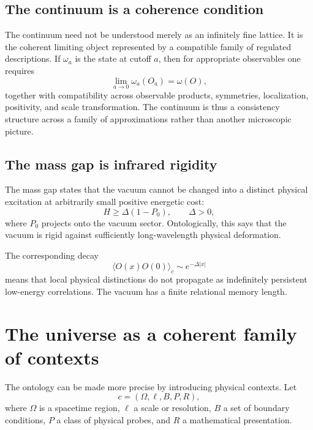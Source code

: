 \documentclass[11pt]{article}
\begin{document}
\subsection{The continuum is a coherence condition}

The continuum need not be understood merely as an infinitely fine lattice.  It
is the coherent limiting object represented by a compatible family of
regulated descriptions.  If $\omega_a$ is the state at cutoff $a$, then for
appropriate observables one requires
\begin{equation}
  \lim_{a\to0}\omega_a(O_a)=\omega(O),
  \label{eq:continuum-coherence}
\end{equation}
together with compatibility across observable products, symmetries,
localization, positivity, and scale transformation.  The continuum is thus a
consistency structure across a family of approximations rather than another
microscopic picture.

\subsection{The mass gap is infrared rigidity}

The mass gap states that the vacuum cannot be changed into a distinct physical
excitation at arbitrarily small positive energetic cost:
\begin{equation}
  H\geq\Delta(1-P_0),
  \qquad \Delta>0,
  \label{eq:mass-gap}
\end{equation}
where $P_0$ projects onto the vacuum sector.  Ontologically, this says that the
vacuum is rigid against sufficiently long-wavelength physical deformation.

The corresponding decay
\begin{equation}
  \langle O(x)O(0)\rangle_c
  \sim e^{-\Delta|x|}
  \label{eq:clustering}
\end{equation}
means that local physical distinctions do not propagate as indefinitely
persistent low-energy correlations.  The vacuum has a finite relational memory
length.

\section{The universe as a coherent family of contexts}

The ontology can be made more precise by introducing physical contexts.  Let
\begin{equation}
  c=(\Omega,\ell,B,P,R),
  \label{eq:context}
\end{equation}
where $\Omega$ is a spacetime region, $\ell$ a scale or resolution, $B$ a set of
boundary conditions, $P$ a class of physical probes, and $R$ a mathematical
presentation.
\end{document}
